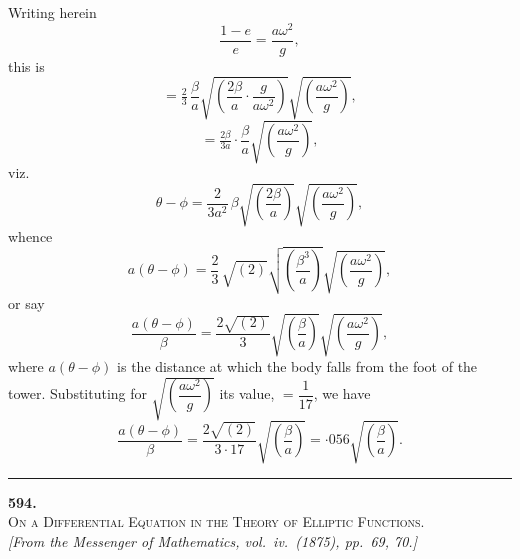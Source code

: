 \documentclass[11pt]{article}
\begin{document}
Writing herein
\[
\frac{1-e}{e}=\frac{a\omega^{2}}{g},
\]
this is
\[
=\tfrac{2}{3}\,\frac{\beta}{a}\sqrt{\!\left(\frac{2\beta}{a}\cdot\frac{g}{a\omega^{2}}\right)}\!\sqrt{\!\left(\frac{a\omega^{2}}{g}\right)},
\]
\[
=\tfrac{2\beta}{3a}\cdot\frac{\beta}{a}\sqrt{\!\left(\frac{a\omega^{2}}{g}\right)},
\]
viz.\
\[
\theta-\phi=\frac{2}{3a^{2}}\,\beta\sqrt{\!\left(\frac{2\beta}{a}\right)}\sqrt{\!\left(\frac{a\omega^{2}}{g}\right)},
\]
whence
\[
a(\theta-\phi)=\frac{2}{3}\,\sqrt{(2)}\sqrt{\!\left(\frac{\beta^{3}}{a}\right)}\sqrt{\!\left(\frac{a\omega^{2}}{g}\right)},
\]
or say
\[
\frac{a(\theta-\phi)}{\beta}=\frac{2\sqrt{(2)}}{3}\sqrt{\!\left(\frac{\beta}{a}\right)}\sqrt{\!\left(\frac{a\omega^{2}}{g}\right)},
\]
where $a(\theta-\phi)$ is the distance at which the body falls from the foot of the
tower. Substituting for $\sqrt{\!\left(\dfrac{a\omega^{2}}{g}\right)}$ its value, $=\dfrac{1}{17}$, we have
\[
\frac{a(\theta-\phi)}{\beta}=\frac{2\sqrt{(2)}}{3\cdot 17}\sqrt{\!\left(\frac{\beta}{a}\right)}=\cdot 056\sqrt{\!\left(\frac{\beta}{a}\right)}.
\]

\bigskip
\hrule
\bigskip


\begin{center}
{\large\textbf{594.}}\\[4pt]
{\scshape On a Differential Equation in the Theory of Elliptic Functions.}\\[4pt]
\textit{[From the \textit{Messenger of Mathematics}, vol.\ iv.\ (1875), pp.\ 69, 70.]}
\end{center}

\medskip
\end{document}
